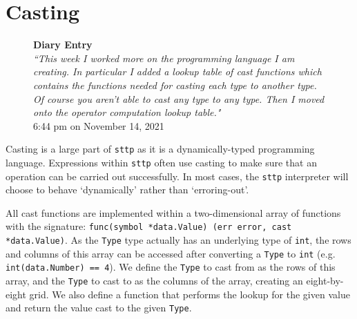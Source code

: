 \section{Casting}
\label{sec:development-casting}

\begin{figure}[H]
    \begin{center}
        \textbf{Diary Entry}\\[0.5em]
        \textit{``This week I worked more on the programming language I am creating. In particular I added a lookup table of cast functions which contains the functions needed for casting each type to another type. Of course you aren’t able to cast any type to any type. Then I moved onto the operator computation lookup table."}\\[0.5em]
        \tiny{6:44 pm on November 14, 2021}
    \end{center}
\end{figure}

Casting is a large part of \verb|sttp| as it is a dynamically-typed programming language. Expressions within \verb|sttp| often use casting to make sure that an operation can be carried out successfully. In most cases, the \verb|sttp| interpreter will choose to behave `dynamically' rather than `erroring-out'.

All cast functions are implemented within a two-dimensional array of functions with the signature: \texttt{func(symbol *data.Value) (err error, cast *data.Value)}. As the \verb|Type| type actually has an underlying type of \texttt{int}, the rows and columns of this array can be accessed after converting a \verb|Type| to \texttt{int} (e.g. \texttt{int(data.Number) == 4}). We define the \verb|Type| to cast from as the rows of this array, and the \verb|Type| to cast to as the columns of the array, creating an eight-by-eight grid. We also define a function that performs the lookup for the given value and return the value cast to the given \verb|Type|.

\inputminted[firstline=26, lastline=43, autogobble, breaklines, tabsize=4]{go}{../../src/eval/casting.go}


